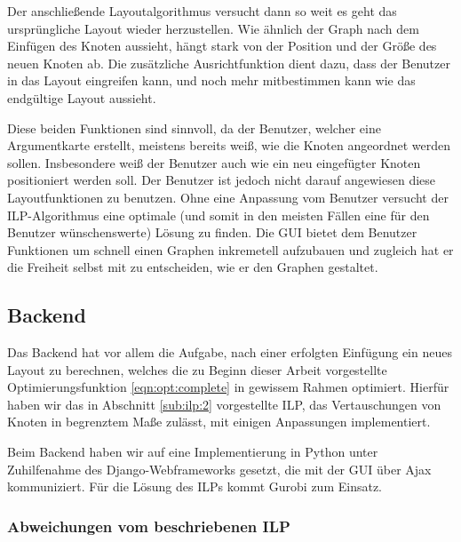 Der anschließende Layoutalgorithmus versucht dann so weit es geht das ursprüngliche
Layout wieder herzustellen. Wie ähnlich der Graph nach dem Einfügen des Knoten aussieht,
hängt stark von der Position und der Größe des neuen Knoten ab. Die zusätzliche
Ausrichtfunktion dient dazu, dass der Benutzer in das Layout eingreifen kann, und noch mehr
mitbestimmen kann wie das endgültige Layout aussieht.

Diese beiden Funktionen sind sinnvoll, da der Benutzer, welcher eine Argumentkarte erstellt,
meistens bereits weiß, wie die Knoten angeordnet werden sollen. Insbesondere weiß der
Benutzer auch wie ein neu eingefügter Knoten positioniert werden soll. Der Benutzer ist
jedoch nicht darauf angewiesen diese Layoutfunktionen zu benutzen. Ohne eine Anpassung
vom Benutzer versucht der ILP-Algorithmus eine optimale (und somit in den meisten Fällen
eine für den Benutzer wünschenswerte) Lösung zu finden.
 Die GUI bietet dem Benutzer Funktionen um schnell einen Graphen inkremetell aufzubauen
und zugleich hat er die Freiheit selbst mit zu entscheiden, wie er den Graphen gestaltet.



\subsection{Backend}

Das Backend hat vor allem die Aufgabe, nach einer erfolgten Einfügung ein neues Layout zu berechnen, welches die zu Beginn dieser Arbeit vorgestellte Optimierungsfunktion \ref{eqn:opt:complete} in gewissem Rahmen optimiert. Hierfür haben wir das in Abschnitt \ref{sub:ilp:2} vorgestellte ILP, das Vertauschungen von Knoten in begrenztem Maße zulässt, mit einigen Anpassungen implementiert.

Beim Backend haben wir auf eine Implementierung in Python unter Zuhilfenahme des Django-Webframeworks\cite{django} gesetzt, die mit der GUI über Ajax kommuniziert. Für die Lösung des ILPs kommt Gurobi\cite{gurobi} zum Einsatz.

\subsubsection{Abweichungen vom beschriebenen ILP}
\label{sub:impl:opt}

